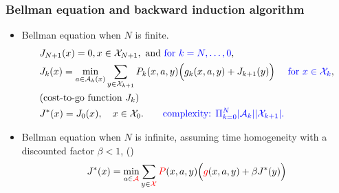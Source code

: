 \documentclass{beamer}
\newcommand{\Prob}{\mathbb{P}}
\def\X{{\mathcal X}}
\def\A{{\mathcal A}}
\def\M{{\mathcal M}}
\newcommand{\blue}[1]{\textcolor{blue}{#1}}
\newcommand{\red}[1]{\textcolor{red}{#1}}
\newcommand{\abs}[1]{|#1|}
\begin{document}
\begin{frame}
  \frametitle{Bellman equation and backward induction algorithm}
  \begin{itemize}
  \item Bellman equation when  $N$ is finite.
    \begin{align*}
      & J_{N+1}(x) =0, x\in \mathcal{X}_{N+1}, \text{ and \blue{for $k=N, \ldots, 0$},}\\
      & J_{k}(x) = \min_{a\in \mathcal{A}_k(x) }\sum_{y\in \mathcal{X}_{k+1}} P_k(x,a, y)\Big(g_k(x,a, y) + J_{k+1}(y)\Big)  \quad  \blue{\text{ for }x\in \mathcal{X}_{k}}, \\
     &\text{(cost-to-go function $J_k$) } \\
     & J^*(x) = J_0(x), \quad x\in \mathcal{X}_0. \qquad \blue{\text{complexity: } \Pi_{k=0}^N\abs{\mathcal{A}_k}\abs{\mathcal{X}_{k+1}}.}
    \end{align*}
  \item Bellman equation when  $N$ is infinite, assuming time homogeneity with
    a discounted factor $\beta<1$, \qquad (\text{\red{$P_k=P$ and $g_k=\beta^k g$}})
    \begin{align*}
      J^*(x) = \min_{a\in \mathcal{\red{A}}} \sum_{y\in \mathcal{\red{X}}} \red{P}(x,a,y)
      \Big(\red{g}(x,a, y)+ \beta J^*(y) \Big)
    \end{align*}
  \end{itemize}
\end{frame}







\end{document}
